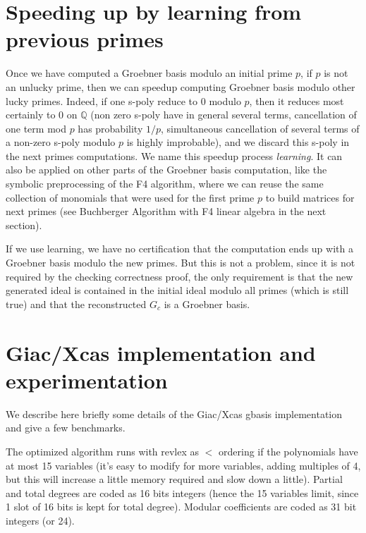\documentclass[a4paper,11pt]{book}
\begin{document}
\begin{giacjshere}
\section{Speeding up by learning from previous primes} \label{sec:learning}
Once we have computed a Groebner basis modulo an initial prime $p$, if $p$ is
not an unlucky prime, then we can speedup computing Groebner basis
modulo other lucky primes. Indeed, if one s-poly reduce to 0 modulo
$p$, then it reduces most certainly to 0 on $\mathbb{Q}$ (non zero s-poly have
in general several terms, cancellation of one term mod $p$ has
probability $1/p$, simultaneous cancellation of several terms of a non-zero
s-poly modulo $p$ is highly improbable), and we discard this s-poly in the
next primes computations. We name this speedup process {\em learning}. 
It can also
be applied on other parts of the Groebner basis computation, like the
symbolic preprocessing of the F4 algorithm, where we can reuse the
same collection of monomials that were used for the first prime $p$ 
to build matrices for next primes (see Buchberger Algorithm with F4 
linear algebra in the next section).

If we use learning, we have no certification that the computation ends up
with a Groebner basis modulo the new primes. But this is not a problem,
since it is not required by the checking correctness proof, the only
requirement is that the new generated ideal is contained in the
initial ideal modulo all primes (which is still true) and 
that the reconstructed $G_c$ is a Groebner basis.

\section{Giac/Xcas implementation and experimentation} \label{sec:giacf4}
We describe here briefly some details of the Giac/Xcas gbasis implementation
and give a few benchmarks.

The optimized algorithm runs with revlex as $<$ ordering
if the polynomials have at most 15
variables (it's easy to modify for more variables, adding multiples of
4, but this will increase a little memory required and
slow down a little).
Partial and total degrees are coded as 16 bits integers (hence the 15
variables limit, since 1 slot of 16 bits is kept for total degree). 
Modular coefficients are coded as 31 bit integers (or 24).


\end{giacjshere}
\end{document}

